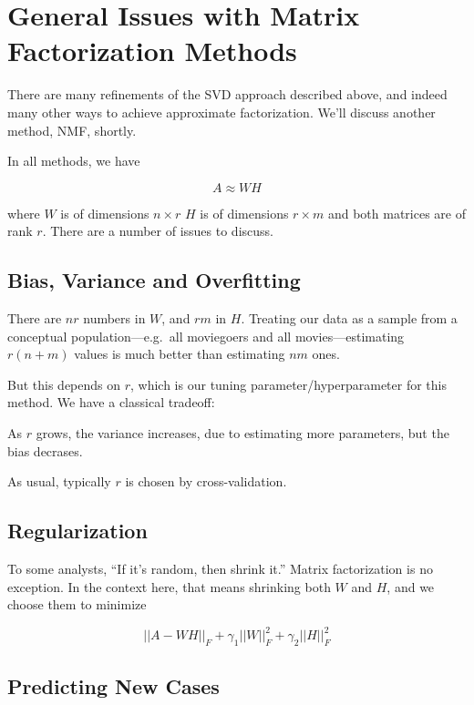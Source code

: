 \section{General Issues with Matrix Factorization Methods}  

There are many refinements of the SVD approach described above, and
indeed many other ways to achieve approximate factorization.  We'll
discuss another method, NMF, shortly.  

In all methods, we have

\begin{equation}
A \approx WH
\end{equation}

where $W$ is of dimensions $n \times r$
$H$ is of dimensions $r \times m$ and both matrices are of rank $r$.
There are a number of issues to discuss.

\subsection{Bias, Variance and Overfitting}

There are $nr$ numbers in $W$, and $rm$ in $H$.  Treating our data as a
sample from a conceptual population---e.g.\ all moviegoers and all
movies---estimating $r(n+m)$ values is much better than estimating $nm$
ones.

But this depends on $r$, which is our tuning parameter/hyperparameter
for this method.  We have a classical tradeoff:

As $r$ grows, the variance increases, due to estimating more
parameters, but the bias decrases.

As usual, typically $r$ is chosen by cross-validation.

\subsection{Regularization}

To some analysts, ``If it's random, then shrink it.''  Matrix
factorization is no exception.  In the context here, that means
shrinking both $W$ and $H$, and we choose them to minimize

\begin{equation}
||A - WH||_F + \gamma_1 ||W||_F^2 + \gamma_2 ||H||_F^2
\end{equation}

\subsection{Predicting New Cases} 

